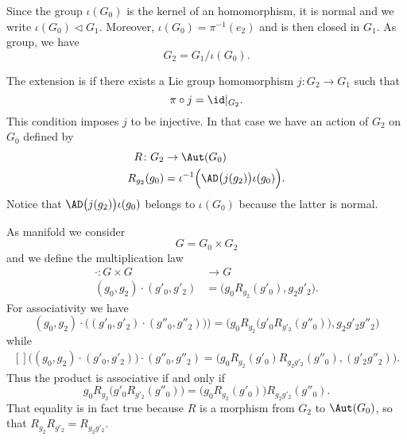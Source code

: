 Since the group $\iota(G_0)$ is the kernel of an homomorphism, it is normal and we write $\iota(G_0)\lhd G_1$. Moreover, $\iota(G_0)=\pi^{-1}(e_2)$ and is then closed in $G_1$. As group, we have
\begin{equation}
    G_2=G_1/\iota(G_0).
\end{equation}

The extension is  if there exists a Lie group homomorphism  $j\colon G_2\to G_1$ such that
\begin{equation}
    \pi\circ j=\id|_{G_2}.
\end{equation}
This condition imposes $j$ to be injective. In that case we have an action of $G_2$ on $G_0$ defined by
\begin{equation}
    \begin{aligned}
        R\colon G_2&\to \Aut(G_0) \\
        R_{g_2}(g_0)&=\iota^{-1}\Big( \AD\big( j(g_2) \big)\iota(g_0) \Big).
    \end{aligned}
\end{equation}
Notice that $\AD\big(j(g_2)\big)\iota(g_0)$ belongs to $\iota(G_0)$ because the latter is normal.

As manifold we consider
\begin{equation}
    G=G_0\times G_2
\end{equation}
and we define the multiplication law
\begin{equation}
    \begin{aligned}
        \cdot\colon G\times G&\to G \\
        (g_0,g_2)\cdot(g'_0,g'_2)&=\big( g_0 R_{g_2}(g'_0),g_2g'_2 \big).
    \end{aligned}
\end{equation}
For associativity we have
\begin{equation}
    (g_0,g_2)\cdot\big( (g'_0,g'_2)\cdot (g''_0,g''_2)) \big)=\Big(  g_0R_{g_2}\big( g'_0R_{g'_2}(g''_0) \big),g_2g'_2g''_2  \Big)
\end{equation}
while
\begin{equation}
    \begin{aligned}[]
        \big( (g_0,g_2)\cdot(g'_0,g'_2) \big)\cdot(g''_0,g''_2)=\big( g_0R_{g_2}(g'_0)R_{g_2g'_2}(g''_0),(g'_2g''_2) \big).
    \end{aligned}
\end{equation}
Thus the product is associative if and only if
\begin{equation}
    g_0R_{g_2}\big( g'_0R_{g'_2}(g''_0) \big)=\big( g_0R_{g_2}(g'_0) \big)R_{g_2g'_2}(g''_0).
\end{equation}
That equality is in fact true because $R$ is a morphism from $G_2$ to $\Aut(G_0)$, so that $R_{g_2}R_{g'_2}=R_{g_2g'_2}$.

